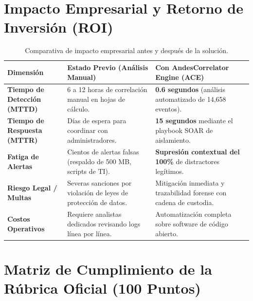 \documentclass[11pt,a4paper]{article}
\begin{document}
\section{Impacto Empresarial y Retorno de Inversión (ROI)}

\begin{table}[h!]
\centering
\small
\begin{tabularx}{\textwidth}{p{3.2cm} p{6cm} X}
\toprule
\textbf{Dimensión} & \textbf{Estado Previo (Análisis Manual)} & \textbf{Con AndesCorrelator Engine (ACE)} \\
\midrule
\textbf{Tiempo de Detección (MTTD)} & 6 a 12 horas de correlación manual en hojas de cálculo. & \textbf{0.6 segundos} (análisis automatizado de 14,658 eventos). \\
\midrule
\textbf{Tiempo de Respuesta (MTTR)} & Días de espera para coordinar con administradores. & \textbf{15 segundos} mediante el playbook SOAR de aislamiento. \\
\midrule
\textbf{Fatiga de Alertas} & Cientos de alertas falsas (respaldo de 500 MB, scripts de TI). & \textbf{Supresión contextual del 100\%} de distractores legítimos. \\
\midrule
\textbf{Riesgo Legal / Multas} & Severas sanciones por violación de leyes de protección de datos. & Mitigación inmediata y trazabilidad forense con cadena de custodia. \\
\midrule
\textbf{Costos Operativos} & Requiere analistas dedicados revisando logs línea por línea. & Automatización completa sobre software de código abierto. \\
\bottomrule
\end{tabularx}
\caption{Comparativa de impacto empresarial antes y después de la solución.}
\end{table}

\section{Matriz de Cumplimiento de la Rúbrica Oficial (100 Puntos)}
\end{document}
